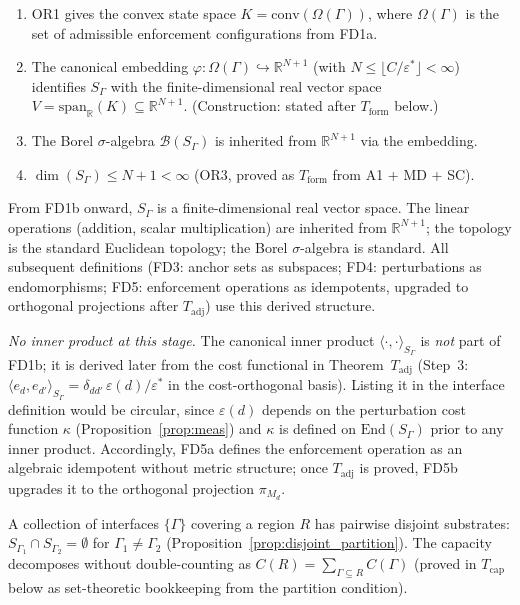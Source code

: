 \documentclass[11pt]{article}
\theoremstyle{remark}
\begin{document}
\begin{tcolorbox}[defbox, title={$\mathrm{FD1}$ (Interface): Two-Stage Definition}]
\begin{enumerate}[nosep,leftmargin=2em,itemsep=2pt,label=(\roman*)]
  \item OR1 gives the convex state space $K = \mathrm{conv}(\Omega(\Gamma))$, where $\Omega(\Gamma)$ is the set of admissible enforcement configurations from FD1a.
  \item The canonical embedding $\varphi: \Omega(\Gamma) \hookrightarrow \mathbb{R}^{N+1}$ (with $N \le \lfloor C/\varepsilon^* \rfloor < \infty$) identifies $S_\Gamma$ with the finite-dimensional real vector space $V = \mathrm{span}_\mathbb{R}(K) \subseteq \mathbb{R}^{N+1}$.  (Construction: stated after $T_{\mathrm{form}}$ below.)
  \item The Borel $\sigma$-algebra $\mathcal{B}(S_\Gamma)$ is inherited from $\mathbb{R}^{N+1}$ via the embedding.
  \item $\dim(S_\Gamma) \le N + 1 < \infty$ (OR3, proved as $T_{\mathrm{form}}$ from A1 + MD + SC).
\end{enumerate}
From FD1b onward, $S_\Gamma$ is a finite-dimensional real vector space.  The linear operations (addition, scalar multiplication) are inherited from $\mathbb{R}^{N+1}$; the topology is the standard Euclidean topology; the Borel $\sigma$-algebra is standard.  All subsequent definitions (FD3: anchor sets as subspaces; FD4: perturbations as endomorphisms; FD5: enforcement operations as idempotents, upgraded to orthogonal projections after $T_{\mathrm{adj}}$) use this derived structure.

\medskip
\noindent\textit{No inner product at this stage.}  The canonical inner product $\langle\cdot,\cdot\rangle_{S_\Gamma}$ is \emph{not} part of FD1b; it is derived later from the cost functional in Theorem~$T_{\mathrm{adj}}$ (Step~3: $\langle e_d, e_{d'}\rangle_{S_\Gamma} = \delta_{dd'}\,\varepsilon(d)/\varepsilon^*$ in the cost-orthogonal basis).  Listing it in the interface definition would be circular, since $\varepsilon(d)$ depends on the perturbation cost function $\kappa$ (Proposition~\ref{prop:meas}) and $\kappa$ is defined on $\mathrm{End}(S_\Gamma)$ prior to any inner product.  Accordingly, FD5a defines the enforcement operation as an algebraic idempotent without metric structure; once $T_{\mathrm{adj}}$ is proved, FD5b upgrades it to the orthogonal projection $\pi_{M_d}$.

A collection of interfaces $\{\Gamma\}$ covering a region $R$ has pairwise disjoint substrates: $S_{\Gamma_1} \cap S_{\Gamma_2} = \emptyset$ for $\Gamma_1 \ne \Gamma_2$ (Proposition~\ref{prop:disjoint_partition}).  The capacity decomposes without double-counting as $C(R) = \sum_{\Gamma \subseteq R} C(\Gamma)$ (proved in $T_{\mathrm{cap}}$ below as set-theoretic bookkeeping from the partition condition).

\end{tcolorbox}
\end{document}
